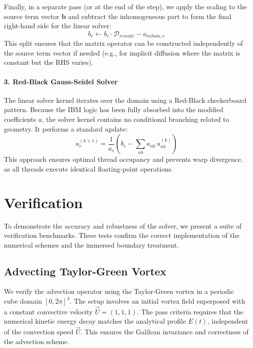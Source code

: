 \documentclass[preprint,12pt]{elsarticle}
\begin{document}
Finally, in a separate pass (or at the end of the step), we apply the scaling to the source term vector $\mathbf{b}$ and subtract the inhomogeneous part to form the final right-hand side for the linear solver:
\begin{equation}
    b_c \leftarrow b_c \cdot \mathcal{D}_{rescale} - a_{inhom,c}
\end{equation}
This split ensures that the matrix operator can be constructed independently of the source term vector if needed (e.g., for implicit diffusion where the matrix is constant but the RHS varies).

\paragraph{3. Red-Black Gauss-Seidel Solver}
The linear solver kernel iterates over the domain using a Red-Black checkerboard pattern. Because the IBM logic has been fully absorbed into the modified coefficients $a$, the solver kernel contains no conditional branching related to geometry. It performs a standard update:
\begin{equation}
    u^{(k+1)}_c = \frac{1}{a_c} \left( b_c - \sum_{nb} a_{nb} \, u^{(k)}_{nb} \right)
\end{equation}
This approach ensures optimal thread occupancy and prevents warp divergence, as all threads execute identical floating-point operations.




\section{Verification}
To demonstrate the accuracy and robustness of the solver, we present a suite of verification benchmarks. These tests confirm the correct implementation of the numerical schemes and the immersed boundary treatment.

\subsection{Advecting Taylor-Green Vortex}
We verify the advection operator using the Taylor-Green vortex in a periodic cube domain $[0, 2\pi]^3$. The setup involves an initial vortex field superposed with a constant convective velocity $\vec{U} = (1, 1, 1)$. The pass criteria requires that the numerical kinetic energy decay matches the analytical profile $E(t)$, independent of the convection speed $\vec{U}$. This ensures the Galilean invariance and correctness of the advection scheme.
\end{document}

